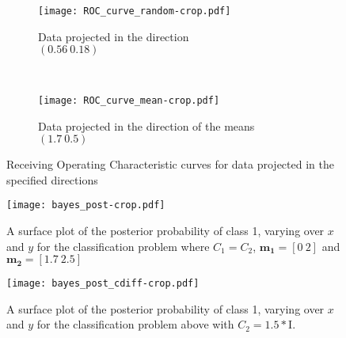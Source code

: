 \documentclass[a4paper,10pt]{article}
\begin{document}
\begin{figure}
    \centering
    \begin{subfigure}[b]{0.45\textwidth}
        \texttt{[image: ROC\_curve\_random-crop.pdf]}
        \caption{Data projected in the direction \\ $(0.56~0.18)$\label{fig:proj_random}}
    \end{subfigure}
    ~%
    \begin{subfigure}[b]{0.45\textwidth}
        \texttt{[image: ROC\_curve\_mean-crop.pdf]}
        \caption{Data projected in the direction of the means \\$(1.7~0.5)$\label{fig:proj_mean}}
    \end{subfigure}
\caption{Receiving Operating Characteristic curves for data projected in the specified directions\label{fig:proj_ROC}}
\end{figure}

\begin{figure}[ht!]
    \centering
    \texttt{[image: bayes\_post-crop.pdf]}
    \caption{A surface plot of the posterior probability of class 1, varying over $x$ and $y$ for the classification problem where $C_1 = C_2$, $\mathbf{m_1} = [0~2]$ and $\mathbf{m_2} = [1.7~2.5]$\label{fig:bayes_post}}
\end{figure}

\begin{figure}[ht!]
    \centering
    \texttt{[image: bayes\_post\_cdiff-crop.pdf]}
    \caption{A surface plot of the posterior probability of class 1, varying over $x$ and $y$ for the classification problem above with $C_2 = 1.5*$I.\label{fig:bayes_post_cdiff}}
\end{figure}
\end{document}
